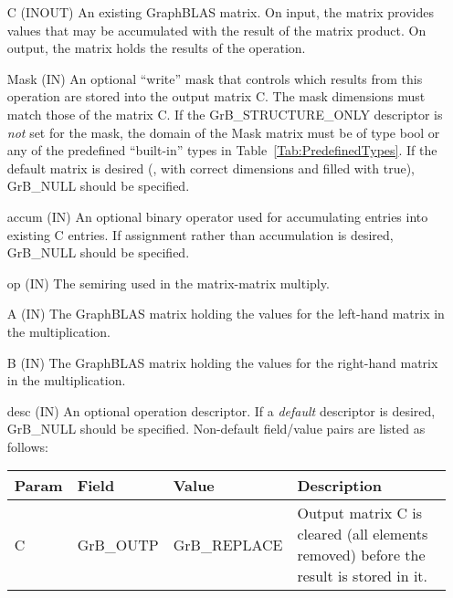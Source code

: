 \begin{itemize}[leftmargin=1.1in]
    \item[{\sf C}]    ({\sf INOUT}) An existing GraphBLAS matrix. On input,
    the matrix provides values that may be accumulated with the result of the
    matrix product.  On output, the matrix holds the results of the
    operation.

    \item[{\sf Mask}] ({\sf IN}) An optional ``write'' mask that controls which
    results from this operation are stored into the output matrix {\sf C}. The 
    mask dimensions must match those of the matrix {\sf C}. If the 
    {\sf GrB\_STRUCTURE\_ONLY} descriptor is {\em not} set for the mask, the domain 
    of the {\sf Mask} matrix must be of type {\sf bool} or any of the predefined 
    ``built-in'' types in Table~\ref{Tab:PredefinedTypes}.  If the default
    matrix is desired (\ie, with correct dimensions and filled with {\sf true}), 
    {\sf GrB\_NULL} should be specified. 

    \item[{\sf accum}] ({\sf IN}) An optional binary operator used for accumulating
    entries into existing {\sf C} entries.
    If assignment rather than accumulation is
    desired, {\sf GrB\_NULL} should be specified.

    \item[{\sf op}]   ({\sf IN}) The semiring used in the matrix-matrix
    multiply.

    \item[{\sf A}]    ({\sf IN}) The GraphBLAS matrix holding the values
    for the left-hand matrix in the multiplication.

    \item[{\sf B}]    ({\sf IN}) The GraphBLAS matrix holding the values for
    the right-hand matrix in the multiplication.

    \item[{\sf desc}] ({\sf IN}) An optional operation descriptor. If
    a \emph{default} descriptor is desired, {\sf GrB\_NULL} should be
    specified. Non-default field/value pairs are listed as follows:  \\

    \begin{tabular}{lllp{2.5in}}
        Param & Field  & Value & Description \\
        \hline
        {\sf C}    & {\sf GrB\_OUTP} & {\sf GrB\_REPLACE} & Output matrix {\sf C}
        is cleared (all elements removed) before the result is stored in it.\\


\end{tabular}
\end{itemize}
